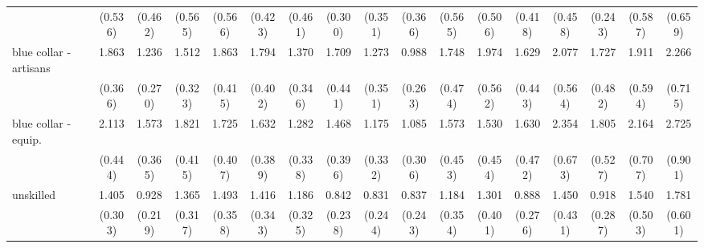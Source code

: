 {\begin{tabular}{l*{16}{c}}
                    &     (0.536)         &     (0.462)         &     (0.565)         &     (0.566)         &     (0.423)         &     (0.461)         &     (0.300)         &     (0.351)         &     (0.366)         &     (0.565)         &     (0.506)         &     (0.418)         &     (0.458)         &     (0.243)         &     (0.587)         &     (0.659)         \\
[1em]
blue collar - artisans&       1.863\sym{**} &       1.236         &       1.512         &       1.863\sym{**} &       1.794\sym{**} &       1.370         &       1.709\sym{*}  &       1.273         &       0.988         &       1.748\sym{*}  &       1.974\sym{*}  &       1.629         &       2.077\sym{**} &       1.727         &       1.911\sym{*}  &       2.266\sym{**} \\
                    &     (0.366)         &     (0.270)         &     (0.323)         &     (0.415)         &     (0.402)         &     (0.346)         &     (0.441)         &     (0.351)         &     (0.263)         &     (0.474)         &     (0.562)         &     (0.443)         &     (0.564)         &     (0.482)         &     (0.594)         &     (0.715)         \\
[1em]
blue collar - equip.&       2.113\sym{***}&       1.573         &       1.821\sym{**} &       1.725\sym{*}  &       1.632\sym{*}  &       1.282         &       1.468         &       1.175         &       1.085         &       1.573         &       1.530         &       1.630         &       2.354\sym{**} &       1.805\sym{*}  &       2.164\sym{*}  &       2.725\sym{**} \\
                    &     (0.444)         &     (0.365)         &     (0.415)         &     (0.407)         &     (0.389)         &     (0.338)         &     (0.396)         &     (0.332)         &     (0.306)         &     (0.453)         &     (0.454)         &     (0.472)         &     (0.673)         &     (0.527)         &     (0.707)         &     (0.901)         \\
[1em]
unskilled           &       1.405         &       0.928         &       1.365         &       1.493         &       1.416         &       1.186         &       0.842         &       0.831         &       0.837         &       1.184         &       1.301         &       0.888         &       1.450         &       0.918         &       1.540         &       1.781         \\
                    &     (0.303)         &     (0.219)         &     (0.317)         &     (0.358)         &     (0.343)         &     (0.325)         &     (0.238)         &     (0.244)         &     (0.243)         &     (0.354)         &     (0.401)         &     (0.276)         &     (0.431)         &     (0.287)         &     (0.503)         &     (0.601)         \\

\end{tabular}}
